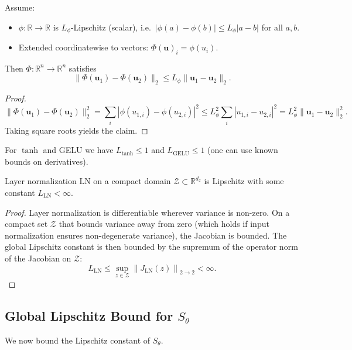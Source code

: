 \documentclass[11pt]{article}
\begin{document}
\begin{lemma}
Assume:
\begin{itemize}
  \item $\phi: \mathbb{R} \to \mathbb{R}$ is $L_\phi$-Lipschitz (scalar), i.e.\ $|\phi(a) - \phi(b)| \le L_\phi |a-b|$ for all $a,b$.
  \item Extended coordinatewise to vectors: $\Phi(\bm{u})_i = \phi(u_i)$.
\end{itemize}
Then $\Phi: \mathbb{R}^n \to \mathbb{R}^n$ satisfies
\[
  \|\Phi(\bm{u}_1) - \Phi(\bm{u}_2)\|_2 \le L_\phi \|\bm{u}_1 - \bm{u}_2\|_2.
\]
\end{lemma}

\begin{proof}
\[
  \|\Phi(\bm{u}_1) - \Phi(\bm{u}_2)\|_2^2 = \sum_i |\phi(u_{1,i}) - \phi(u_{2,i})|^2 \le L_\phi^2 \sum_i |u_{1,i} - u_{2,i}|^2 = L_\phi^2 \|\bm{u}_1 - \bm{u}_2\|_2^2.
\]
Taking square roots yields the claim.
\end{proof}

For $\tanh$ and GELU we have $L_{\tanh} \le 1$ and $L_{\mathrm{GELU}} \le 1$ (one can use known bounds on derivatives).

\begin{lemma}
Layer normalization $\mathrm{LN}$ on a compact domain $\mathcal{Z} \subset \mathbb{R}^{d_z}$ is Lipschitz with some constant $L_{\mathrm{LN}} < \infty$.
\end{lemma}

\begin{proof}
Layer normalization is differentiable wherever variance is non-zero. On a compact set $\mathcal{Z}$ that bounds variance away from zero (which holds if input normalization ensures non-degenerate variance), the Jacobian is bounded. The global Lipschitz constant is then bounded by the supremum of the operator norm of the Jacobian on $\mathcal{Z}$:
\[
  L_{\mathrm{LN}} \le \sup_{z \in \mathcal{Z}} \left\| J_{\mathrm{LN}}(z) \right\|_{2\to 2} < \infty.
\]
\end{proof}

\subsection{Global Lipschitz Bound for $S_\theta$}

We now bound the Lipschitz constant of $S_\theta$.
\end{document}
